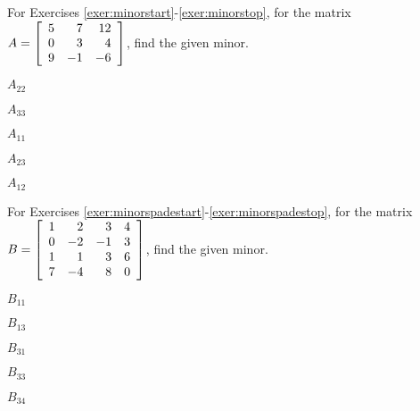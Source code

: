 %
%
\noindent For Exercises \ref{exer:minorstart}-\ref{exer:minorstop}, for the matrix $A = \mtx{rrr}{ 5 & 7 & 12 \\ 0 & 3 & 4 \\  9 & -1 & -6}$, find the given minor.
\begin{enumerate}[!HW!, start=1]
\begin{multicols}{5}
\item\label{exer:minorstart} $A_{22}$ %
\item $A_{33}$ %
\item $A_{11}$ %
\item $A_{23}$ %
\item\label{exer:minorstop} $A_{12}$ %
\end{multicols}
\end{enumerate}

\noindent For Exercises \ref{exer:minorspadestart}-\ref{exer:minorspadestop}, for the matrix $B = \mtx{rrrr}{1 & 2 & 3 & 4 \\ 0 & -2 & -1 & 3 \\ 1 & 1 & 3 & 6\\ 7 & -4 & 8 & 0}$, find the given minor.
\begin{enumerate}[!HW!, label=$\spadesuit$ \arabic*., ref=\arabic*]
\begin{multicols}{5}
\item\label{exer:minorspadestart} $B_{11}$
\item $B_{13}$
\item $B_{31}$
\item $B_{33}$
\item\label{exer:minorspadestop} $B_{34}$
\end{multicols}
\end{enumerate}

